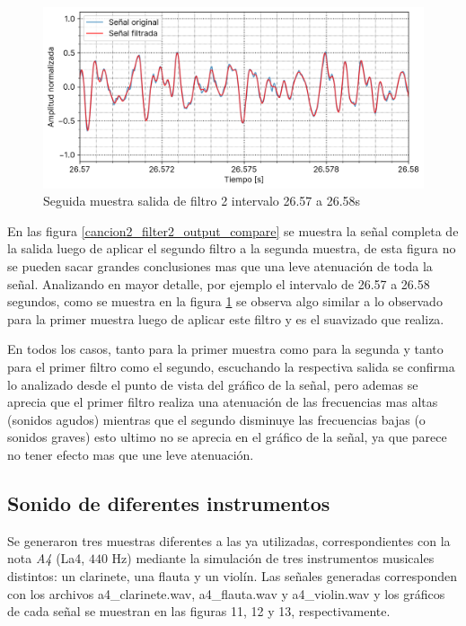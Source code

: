 \documentclass[12pt]{article}
\begin{document}
\begin{figure}
\centering
\includegraphics{plot/cancion2_6s_filter2_output_compare_26_57_a_26_58.png}
\caption{Seguida muestra salida de filtro 2 intervalo 26.57 a 26.58s}
\label{cancion2_6s_filter2_output_compare_26_57_a_26_58}
\end{figure}


En las figura \ref{cancion2_filter2_output_compare} se muestra la señal completa
de la salida luego de aplicar el segundo filtro a la segunda muestra, de esta
figura no se pueden sacar grandes conclusiones mas que una leve atenuación de
toda la señal. Analizando en mayor detalle, por ejemplo el intervalo de 26.57 a
26.58 segundos, como se muestra en la figura
\ref{cancion2_6s_filter2_output_compare_26_57_a_26_58} se observa algo similar a
lo observado para la primer muestra luego de aplicar este filtro y es el
suavizado que realiza.

En todos los casos, tanto para la primer muestra como para la segunda y
tanto para el primer filtro como el segundo, escuchando la respectiva
salida se confirma lo analizado desde el punto de vista del gráfico de
la señal, pero ademas se aprecia que el primer filtro realiza una
atenuación de las frecuencias mas altas (sonidos agudos) mientras que el
segundo disminuye las frecuencias bajas (o sonidos graves) esto ultimo
no se aprecia en el gráfico de la señal, ya que parece no tener efecto
mas que une leve atenuación.

\hypertarget{sonido-de-diferentes-instrumentos}{%
\subsection{Sonido de diferentes
instrumentos}\label{sonido-de-diferentes-instrumentos}}

Se generaron tres muestras diferentes a las ya utilizadas, correspondientes con
la nota \emph{A4} (La4, \(440\) Hz) mediante la simulación de tres instrumentos
musicales distintos: un clarinete, una flauta y un violín. Las señales generadas
corresponden con los archivos a4\_clarinete.wav, a4\_flauta.wav y a4\_violin.wav
y los gráficos de cada señal se muestran en las figuras 11, 12 y 13,
respectivamente.
\end{document}
